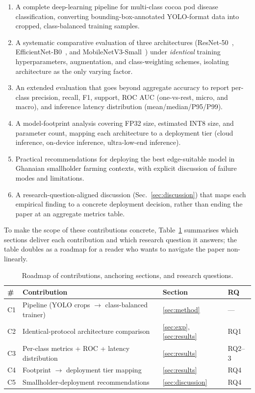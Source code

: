 \documentclass[conference,10pt]{IEEEtran}
\begin{document}
\begin{enumerate}
\item A complete deep-learning pipeline for multi-class cocoa pod disease
classification, converting bounding-box-annotated YOLO-format data into
cropped, class-balanced training samples.
\item A systematic comparative evaluation of three architectures
(ResNet-50~\cite{he2016}, EfficientNet-B0~\cite{tan2019}, and
MobileNetV3-Small~\cite{howard2019}) under \emph{identical} training
hyperparameters, augmentation, and class-weighting schemes, isolating
architecture as the only varying factor.
\item An extended evaluation that goes beyond aggregate accuracy to report
per-class precision, recall, F1, support, ROC AUC (one-vs-rest, micro, and
macro), and inference latency distribution (mean/median/P95/P99).
\item A model-footprint analysis covering FP32 size, estimated INT8 size, and
parameter count, mapping each architecture to a deployment tier (cloud
inference, on-device inference, ultra-low-end inference).
\item Practical recommendations for deploying the best edge-suitable model in
Ghanaian smallholder farming contexts, with explicit discussion of failure
modes and limitations.
\item A research-question-aligned discussion (Sec.~\ref{sec:discussion}) that
maps each empirical finding to a concrete deployment decision, rather than
ending the paper at an aggregate metrics table.
\end{enumerate}

To make the scope of these contributions concrete,
Table~\ref{tab:contributions} summarises which sections deliver each
contribution and which research question it answers; the table doubles as a
roadmap for a reader who wants to navigate the paper non-linearly.

\begin{table}[t]
\centering
\caption{Roadmap of contributions, anchoring sections, and research questions.}
\label{tab:contributions}
\renewcommand{\arraystretch}{1.15}
\begin{tabular}{p{}p{}p{}p{}}
\toprule
\textbf{\#} & \textbf{Contribution} & \textbf{Section} & \textbf{RQ}\\
\midrule
C1 & Pipeline (YOLO crops $\rightarrow$ class-balanced trainer) & \ref{sec:method} & --- \\
C2 & Identical-protocol architecture comparison & \ref{sec:exp},\ref{sec:results} & RQ1 \\
C3 & Per-class metrics + ROC + latency distribution & \ref{sec:results} & RQ2--3 \\
C4 & Footprint $\rightarrow$ deployment tier mapping & \ref{sec:results} & RQ4 \\
C5 & Smallholder-deployment recommendations & \ref{sec:discussion} & RQ4 \\
\bottomrule
\end{tabular}
\end{table}
\end{document}
